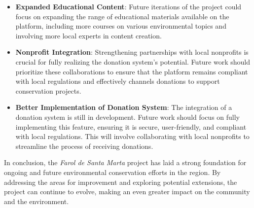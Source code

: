 \begin{itemize}
    \item \textbf{Expanded Educational Content}: Future iterations of the project could focus on expanding the range of educational materials available on the platform, including more courses on various environmental topics and involving more local experts in content creation.
    \item \textbf{Nonprofit Integration}: Strengthening partnerships with local nonprofits is crucial for fully realizing the donation system's potential. Future work should prioritize these collaborations to ensure that the platform remains compliant with local regulations and effectively channels donations to support conservation projects.
    \item \textbf{Better Implementation of Donation System}: The integration of a donation system is still in development. Future work should focus on fully implementing this feature, ensuring it is secure, user-friendly, and compliant with local regulations. This will involve collaborating with local nonprofits to streamline the process of receiving donations.
\end{itemize}


In conclusion, the \textit{Farol de Santa Marta} project has laid a strong foundation for ongoing and future environmental conservation efforts in the region. By addressing the areas for improvement and exploring potential extensions, the project can continue to evolve, making an even greater impact on the community and the environment.


